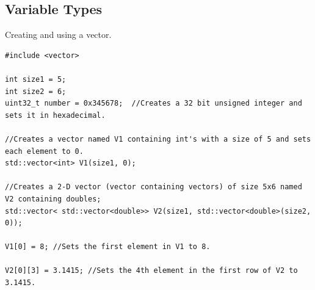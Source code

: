 \subsection{Variable Types}

Creating and using a vector.
\begin{lstlisting}
#include <vector>

int size1 = 5;
int size2 = 6;
uint32_t number = 0x345678;  //Creates a 32 bit unsigned integer and sets it in hexadecimal.

//Creates a vector named V1 containing int's with a size of 5 and sets each element to 0. 
std::vector<int> V1(size1, 0); 

//Creates a 2-D vector (vector containing vectors) of size 5x6 named V2 containing doubles;
std::vector< std::vector<double>> V2(size1, std::vector<double>(size2, 0)); 

V1[0] = 8; //Sets the first element in V1 to 8.

V2[0][3] = 3.1415; //Sets the 4th element in the first row of V2 to 3.1415.
\end{lstlisting}







